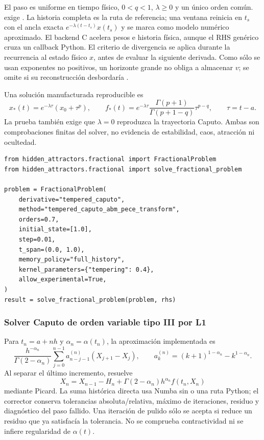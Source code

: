 El paso es uniforme en tiempo físico, \(0<q<1\), \(\lambda\ge0\) y un único
orden común.  exige
. La historia completa es
la ruta de referencia; una ventana reinicia en \(t_s\) con el ancla exacta
\(e^{-\lambda(t-t_s)}x(t_s)\) y se marca como modelo numérico aproximado. El
backend C acelera pesos e historia física, aunque el RHS genérico cruza un
callback Python. El criterio de divergencia se aplica durante la recurrencia al
estado físico \(x\), antes de evaluar la siguiente derivada. Como sólo se usan
exponentes no positivos, un horizonte grande no obliga a almacenar \(v\);
 se omite si su reconstrucción desbordaría
.

Una solución manufacturada reproducible es
\[
 x_*(t)=e^{-\lambda\tau}(x_0+\tau^p),\qquad
 f_*(t)=e^{-\lambda\tau}
 \frac{\Gamma(p+1)}{\Gamma(p+1-q)}\tau^{p-q},\qquad \tau=t-a.
\]
La prueba también exige que \(\lambda=0\) reproduzca la trayectoria Caputo.
Ambas son comprobaciones finitas del solver, no evidencia de estabilidad,
caos, atracción ni ocultedad.

\begin{verbatim}
from hidden_attractors.fractional import FractionalProblem
from hidden_attractors.fractional import solve_fractional_problem

problem = FractionalProblem(
    derivative="tempered_caputo",
    method="tempered_caputo_abm_pece_transform",
    orders=0.7,
    initial_state=[1.0],
    step=0.01,
    t_span=(0.0, 1.0),
    memory_policy="full_history",
    kernel_parameters={"tempering": 0.4},
    allow_experimental=True,
)
result = solve_fractional_problem(problem, rhs)
\end{verbatim}

\subsubsection{Solver Caputo de orden variable tipo III por L1}

Para \(t_n=a+nh\) y \(\alpha_n=\alpha(t_n)\), la aproximación implementada es
\[
 \frac{h^{-\alpha_n}}{\Gamma(2-\alpha_n)}
 \sum_{j=0}^{n-1}a_{n-j-1}^{(n)}(X_{j+1}-X_j),\qquad
 a_k^{(n)}=(k+1)^{1-\alpha_n}-k^{1-\alpha_n}.
\]
Al separar el último incremento, 
resuelve
\[
 X_n=X_{n-1}-H_n+\Gamma(2-\alpha_n)h^{\alpha_n}f(t_n,X_n)
\]
mediante Picard. La suma histórica directa usa Numba sin  o
una ruta Python; el corrector conserva tolerancias absoluta/relativa, máximo de
iteraciones, residuo y diagnóstico del paso fallido. Una iteración de pulido sólo
se acepta si reduce un residuo que ya satisfacía la tolerancia. No se comprueba
contractividad ni se infiere regularidad de \(\alpha(t)\).

